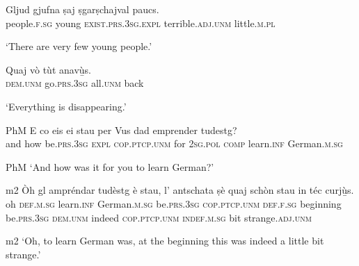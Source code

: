 \begin{linenumbers}
	\gll    Gljud gjufna ṣaj ṣgarṣchajval paucs.\\
	people.\textsc{f.sg} young \textsc{exist.prs.3sg.expl} terrible.\textsc{adj.unm} little.\textsc{m.pl}  \\
\end{linenumbers}
\medskip
\glt `There are very few young people.'
\medskip

\begin{linenumbers}
	\gll    Quaj vò tùt anavù̱s.\\
	\textsc{dem.unm} go.\textsc{prs.3sg} all.\textsc{unm} back \\
\end{linenumbers}
\medskip
\glt `Everything is disappearing.'
\medskip

\begin{linenumbers}
	\gll    {\ob}PhM{\cb} E co eis ei stau per Vus dad emprender tudestg?\\
	{} and how be.\textsc{prs.3sg} \textsc{expl} \textsc{cop.ptcp.unm} for \textsc{2sg.pol} \textsc{comp} learn.\textsc{inf} German.\textsc{m.sg} \\
\end{linenumbers}
\medskip
\glt {\ob}PhM{\cb} `And how was it for you to learn German?'
\medskip

\begin{linenumbers}
	\gll {\ob}m2{\cb} Òh gl ampréndar tudèstg è stau, l’ antschata ṣè quaj schòn stau in téc curjù̱s.\\
	{} oh \textsc{def.m.sg} learn.\textsc{inf} German.\textsc{m.sg} be.\textsc{prs.3sg}  \textsc{cop.ptcp.unm} \textsc{def.f.sg} beginning be.\textsc{prs.3sg} \textsc{dem.unm} indeed \textsc{cop.ptcp.unm} \textsc{indef.m.sg} bit strange.\textsc{adj.unm}\\
\end{linenumbers}
\medskip
\glt {\ob}m2{\ob} `Oh, to learn German was, at the beginning this was indeed a little bit strange.'
\medskip


